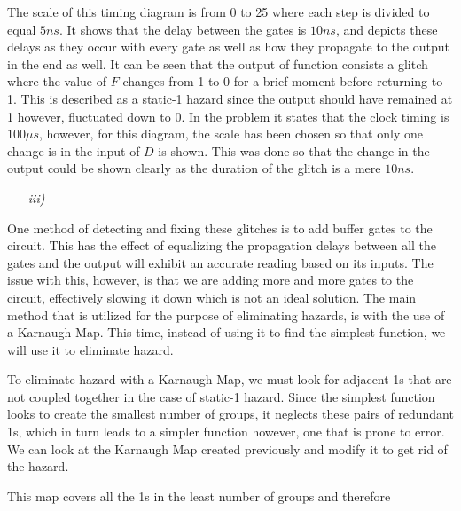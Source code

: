 \documentclass[12pt]{article}
\begin{document}
    \par The scale of this timing diagram is from 0 to 25 where each step is
    divided to equal $5ns$. It shows that the delay between the gates is $10ns$,
    and depicts these delays as they occur with every gate as well as how they
    propagate to the output in the end as well. It can be seen that the output
    of function consists a glitch where the value of $F$ changes from 1 to 0 for
    a brief moment before returning to 1. This is described as a static-1 hazard
    since the output should have remained at 1 however, fluctuated down to 0. In
    the problem it states that the clock timing is $100\mu s$, however, for this
    diagram, the scale has been chosen so that only one change is in the input
    of $D$ is shown. This was done so that the change in the output could be
    shown clearly as the duration of the glitch is a mere $10ns$.
    \begin{itemize}
        \item[\textit{iii)}]
    \end{itemize}
    \par One method of detecting and fixing these glitches is to add buffer
    gates to the circuit. This has the effect of equalizing the propagation
    delays between all the gates and the output will exhibit an accurate reading
    based on its inputs. The issue with this, however, is that we are adding
    more and more gates to the circuit, effectively slowing it down which is not
    an ideal solution. The main method that is utilized for the purpose of
    eliminating hazards, is with the use of a Karnaugh Map. This time, instead
    of using it to find the simplest function, we will use it to eliminate
    hazard.
    \par To eliminate hazard with a Karnaugh Map, we must look for adjacent 1s
    that are not coupled together in the case of static-1 hazard. Since the
    simplest function looks to create the smallest number of groups, it neglects
    these pairs of redundant 1s, which in turn leads to a simpler function
    however, one that is prone to error. We can look at the Karnaugh Map created
    previously and modify it to get rid of the hazard.
    \begin{center}
    \end{center}
    \par This map covers all the 1s in the least number of groups and therefore
\end{document}
